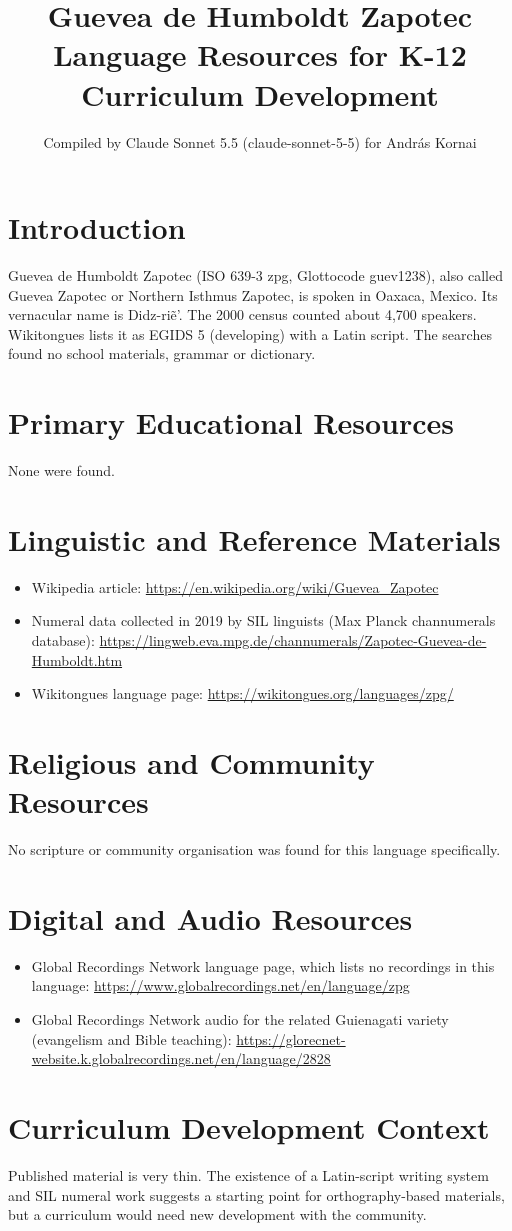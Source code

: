 \documentclass[12pt]{article}
\title{Guevea de Humboldt Zapotec Language Resources for K-12 Curriculum Development}
\author{Compiled by Claude Sonnet 5.5 (claude-sonnet-5-5) for Andr\'as Kornai}
\date{}
\begin{document}
\maketitle

\section{Introduction}
Guevea de Humboldt Zapotec (ISO 639-3 zpg, Glottocode guev1238), also called Guevea Zapotec or Northern Isthmus Zapotec, is spoken in Oaxaca, Mexico. Its vernacular name is Didz-ri\~e'. The 2000 census counted about 4,700 speakers. Wikitongues lists it as EGIDS 5 (developing) with a Latin script. The searches found no school materials, grammar or dictionary.

\section{Primary Educational Resources}
None were found.

\section{Linguistic and Reference Materials}
\begin{itemize}
\item Wikipedia article: \url{https://en.wikipedia.org/wiki/Guevea_Zapotec}
\item Numeral data collected in 2019 by SIL linguists (Max Planck channumerals database): \url{https://lingweb.eva.mpg.de/channumerals/Zapotec-Guevea-de-Humboldt.htm}
\item Wikitongues language page: \url{https://wikitongues.org/languages/zpg/}
\end{itemize}

\section{Religious and Community Resources}
No scripture or community organisation was found for this language specifically.

\section{Digital and Audio Resources}
\begin{itemize}
\item Global Recordings Network language page, which lists no recordings in this language: \url{https://www.globalrecordings.net/en/language/zpg}
\item Global Recordings Network audio for the related Guienagati variety (evangelism and Bible teaching): \url{https://glorecnet-website.k.globalrecordings.net/en/language/2828}
\end{itemize}

\section{Curriculum Development Context}
Published material is very thin. The existence of a Latin-script writing system and SIL numeral work suggests a starting point for orthography-based materials, but a curriculum would need new development with the community.
\end{document}
